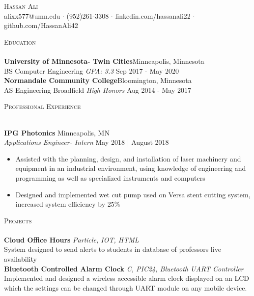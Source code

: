 \documentclass[a4paper]{article}
\newcommand{\lineunder} {
	\vspace*{-8pt} \\
	\hspace*{-18pt} \hrulefill \\
}
\newcommand{\header} [1] {
	{\hspace*{-18pt}\vspace*{6pt} \textsc{#1}}
	\vspace*{-6pt} \lineunder
}
\begin{document}
	\vspace*{-40pt}
	
	
	
	\vspace*{-10pt}
	\begin{center}
		{\Huge \scshape {Hassan Ali}}\\
		alixx577@umn.edu $\cdot$ (952)261-3308 $\cdot$ linkedin.com/hassanali22 $\cdot$ github.com/HassanAli42\\
	\end{center}
	
	\header{Education}
	\textbf{University of Minnesota- Twin Cities}\hfill Minneapolis, Minnesota\\
	BS Computer Engineering \textit{GPA: 3.3} \hfill Sep 2017 - May 2020\\
	\vspace{2mm}
	\textbf{Normandale Community College}\hfill Bloomington, Minnesota\\
	AS Engineering Broadfield \textit{High Honors} \hfill Aug 2014 - May 2017\\
	\vspace{2mm}
	
	\header{Professional Experience}
	\vspace{1mm}
	
	\textbf{IPG Photonics} \hfill Minneapolis, MN\\
	\textit{Applications Engineer- Intern} \hfill May 2018 | August 2018\\
	\vspace{-1mm}
	\begin{itemize} \itemsep 1pt
		\item Assisted with the planning, design, and installation of laser machinery and equipment in an industrial environment, using knowledge of engineering and programming as well as specialized instruments and computers
		\item Designed and implemented wet cut pump used on Versa stent cutting system, increased system efficiency by 25\%
	\end{itemize}

	\header{Projects}
{\textbf{Cloud Office Hours}} {\sl Particle, IOT, HTML} \\
System designed to send alerts to students in database of professors live availability\\
\vspace*{2mm}
{\textbf{Bluetooth Controlled Alarm Clock}} {\sl C, PIC24, Bluetooth UART Controller} \\
Implemented and designed a wireless accessible alarm clock displayed on an LCD which the settings can be changed through UART module on any mobile device.\\
\vspace*{2mm}
\end{document}
